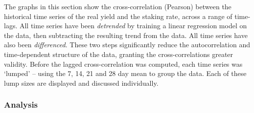 \documentclass[longbibliography,nofootinbib]{revtex4-1}
\begin{document}
The graphs in this section show the cross-correlation (Pearson) between the historical time series of the real yield and the staking rate, across a range of time-lags. All time series have been \textit{detrended} by training a linear regression model on the data, then subtracting the resulting trend from the data. All time series have also been \textit{differenced}. These two steps significantly reduce the autocorrelation and time-dependent structure of the data, granting the cross-correlations greater validity. Before the lagged cross-correlation was computed, each time series was `lumped' – using the 7, 14, 21 and 28 day mean to group the data. Each of these lump sizes are displayed and discussed individually.

\subsubsection{Analysis}
\end{document}
